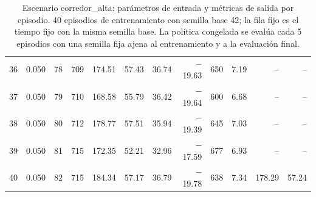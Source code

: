 \begin{table}[H]
\begin{tabular}{rrrrrrrrrrrr}
36 & 0.050 & 78 & 709 & 174.51 & 57.43 & 36.74 & $-$19.63 & 650 & 7.19 & -- & -- \\
37 & 0.050 & 79 & 710 & 168.58 & 55.79 & 36.42 & $-$19.64 & 600 & 6.68 & -- & -- \\
38 & 0.050 & 80 & 712 & 178.77 & 57.51 & 35.94 & $-$19.39 & 645 & 7.03 & -- & -- \\
39 & 0.050 & 81 & 715 & 172.35 & 52.21 & 32.96 & $-$17.59 & 677 & 6.93 & -- & -- \\
40 & 0.050 & 82 & 715 & 184.34 & 57.17 & 36.79 & $-$19.78 & 638 & 7.34 & 178.29 & 57.24 \\
\bottomrule
\end{tabular}
\caption[Escenario corredor\_alta: episodios de entrenamiento]{Escenario corredor\_alta: parámetros de entrada y métricas de salida por episodio. 40 episodios de entrenamiento con semilla base 42; la fila fijo es el tiempo fijo con la misma semilla base. La política congelada se evalúa cada 5 episodios con una semilla fija ajena al entrenamiento y a la evaluación final.}
\label{tab:corredor_alta-episodios}
\end{table}

